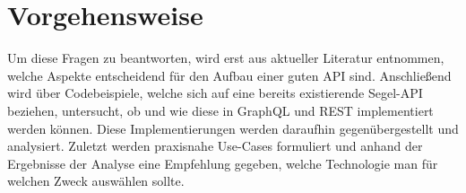 \section{Vorgehensweise}

Um diese Fragen zu beantworten, wird erst aus aktueller Literatur entnommen, welche Aspekte entscheidend für den Aufbau einer guten API sind. Anschließend wird über Codebeispiele, welche sich auf eine bereits existierende Segel-API beziehen, untersucht, ob und wie diese in GraphQL und REST implementiert werden können. Diese Implementierungen werden daraufhin gegenübergestellt und analysiert. Zuletzt werden praxisnahe Use-Cases formuliert und anhand der Ergebnisse der Analyse eine Empfehlung gegeben, welche Technologie man für welchen Zweck auswählen sollte. 